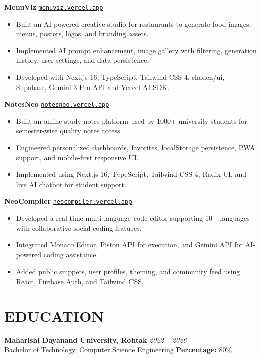\documentclass[a4paper,11pt]{article}
\begin{document}
\vspace{2pt}

\textbf{MenuViz} \hfill \href{https://menuviz.vercel.app}{\texttt{menuviz.vercel.app}}
\begin{itemize}
    \item Built an AI-powered creative studio for restaurants to generate food images, menus, posters, logos, and branding assets.
    \item Implemented AI prompt enhancement, image gallery with filtering, generation history, user settings, and data persistence.
    \item Developed with Next.js 16, TypeScript, Tailwind CSS 4, shadcn/ui, Supabase, Gemini-3-Pro API and Vercel AI SDK.
\end{itemize}

\vspace{2pt}

\textbf{NotesNeo} \hfill \href{https://notesneo.vercel.app}{\texttt{notesneo.vercel.app}}
\begin{itemize}
    \item Built an online study notes platform used by 1000+ university students for semester-wise quality notes access.
    \item Engineered personalized dashboards, favorites, localStorage persistence, PWA support, and mobile-first responsive UI.
    \item Implemented using Next.js 16, TypeScript, Tailwind CSS 4, Radix UI, and live AI chatbot for student support.
\end{itemize}

\vspace{2pt}

\textbf{NeoCompiler} \hfill \href{https://neocompiler.vercel.app}{\texttt{neocompiler.vercel.app}}
\begin{itemize}
    \item Developed a real-time multi-language code editor supporting 10+ languages with collaborative social coding features.
    \item Integrated Monaco Editor, Piston API for execution, and Gemini API for AI-powered coding assistance.
    \item Added public snippets, user profiles, theming, and community feed using React, Firebase Auth, and Tailwind CSS.
\end{itemize}

\section*{EDUCATION}

\textbf{Maharishi Dayanand University, Rohtak} \hfill \textit{2022 -- 2026}\\
Bachelor of Technology, Computer Science Engineering \hfill \textbf{Percentage:} 80\%
\end{document}
